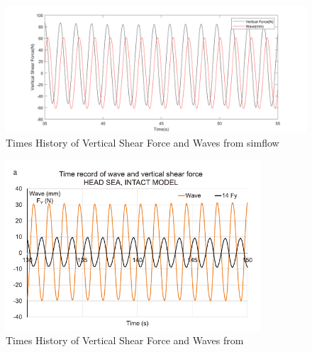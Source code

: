\documentclass[12pt]{article} %
\begin{document}
\begin{figure}[ht]
    \centering
    \includegraphics[width=1\textwidth]{Myresults.png}
    \caption{Times History of Vertical Shear Force and Waves from simflow}
\end{figure}
\begin{figure}[ht]
    \centering
    \includegraphics[width=0.85\textwidth]{ref_results.png}
    \caption{Times History of Vertical Shear Force and Waves from \cite{Begovic2017}}
\end{figure}

\clearpage
\end{document}
